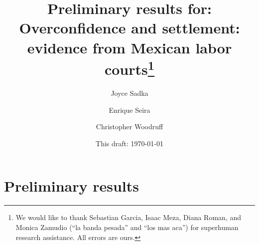 \documentclass[11pt]{article}
\begin{document}
\title{Preliminary results for: Overconfidence and settlement: evidence from Mexican labor courts\thanks{We would like to thank Sebastian Garcia, Isaac Meza, Diana Roman, and Monica Zamudio (``la banda pesada'' and ``los mas aca'') for superhuman research assistance.  All errors are ours.}}
\author{Joyce Sadka \and Enrique Seira  \and Christopher Woodruff }
\date{This draft: \today \\[2 cm]}



\maketitle


\section{Preliminary results}
\end{document}
